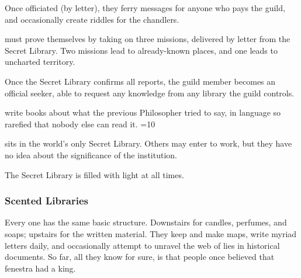 \begin{multicols}{2}
\begin{description}
  Once officiated (by letter), they ferry messages for anyone who pays the guild, and occasionally create riddles for the chandlers.
  \item[\Glspl{seeker}]
  must prove themselves by taking on three missions, delivered by letter from the Secret Library.
  Two missions lead to already-known places, and one leads to uncharted territory.

  Once the Secret Library confirms all reports, the guild member becomes an official \gls{seeker}, able to request any knowledge from any library the guild controls.
  \item[Philosophers]
  write books about what the previous Philosopher tried to say, in language so rarefied that nobody else can read it.
  \ifnum\value{season}=10
  \item[The Last Librarian]
  sits in the world's only Secret Library.
  Others may enter to work, but they have no idea about the significance of the institution.

  The Secret Library is filled with light at all times.
  \fi
\end{description}

\subsubsection{Scented Libraries}

Every one has the same basic structure.
Downstairs for candles, perfumes, and soaps; upstairs for the written material.
They keep and make maps, write myriad letters daily, and occasionally attempt to unravel the web of lies in historical documents.
So far, all they know for sure, is that people once believed that \gls{fenestra} had a king.

\end{multicols}

